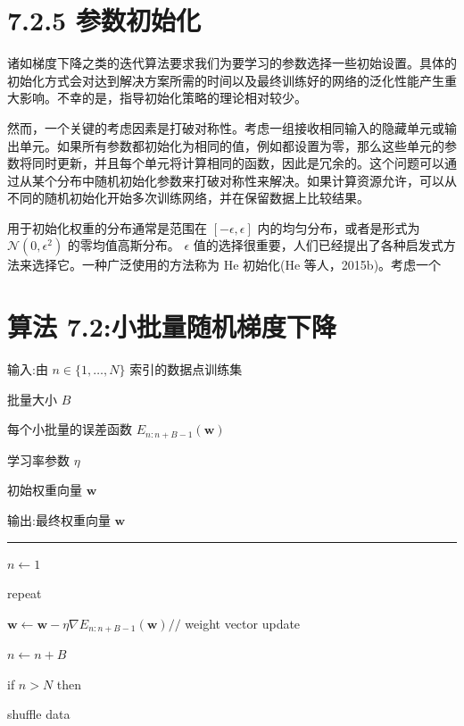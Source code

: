 \documentclass[10pt]{article}
\newcommand{\HRule}{\begin{center}\rule{0.9\linewidth}{0.2mm}\end{center}}
\begin{document}
\section*{7.2.5 参数初始化}

诸如梯度下降之类的迭代算法要求我们为要学习的参数选择一些初始设置。具体的初始化方式会对达到解决方案所需的时间以及最终训练好的网络的泛化性能产生重大影响。不幸的是，指导初始化策略的理论相对较少。

然而，一个关键的考虑因素是打破对称性。考虑一组接收相同输入的隐藏单元或输出单元。如果所有参数都初始化为相同的值，例如都设置为零，那么这些单元的参数将同时更新，并且每个单元将计算相同的函数，因此是冗余的。这个问题可以通过从某个分布中随机初始化参数来打破对称性来解决。如果计算资源允许，可以从不同的随机初始化开始多次训练网络，并在保留数据上比较结果。

用于初始化权重的分布通常是范围在 \(\left\lbrack  {-\epsilon ,\epsilon }\right\rbrack\) 内的均匀分布，或者是形式为 \(\mathcal{N}\left( {0,{\epsilon }^{2}}\right)\) 的零均值高斯分布。 \(\epsilon\) 值的选择很重要，人们已经提出了各种启发式方法来选择它。一种广泛使用的方法称为 He 初始化(He 等人，2015b)。考虑一个

\section*{算法 7.2:小批量随机梯度下降}

输入:由 \(n \in  \{ 1,\ldots ,N\}\) 索引的数据点训练集

批量大小 \(B\)

每个小批量的误差函数 \({E}_{n : n + B - 1}\left( \mathbf{w}\right)\)

学习率参数 \(\eta\)

初始权重向量 \(\mathbf{w}\)

输出:最终权重向量 \(\mathbf{w}\)

\HRule

\(n \leftarrow  1\)

repeat

\hspace*{1em} \(\mathbf{w} \leftarrow  \mathbf{w} - \eta \nabla {E}_{n : n + B - 1}\left( \mathbf{w}\right) //\) weight vector update

\hspace*{1em} \(n \leftarrow  n + B\)

\hspace*{1em} if \(n > N\) then

\hspace*{2em} shuffle data
\end{document}
